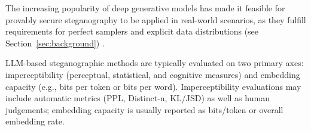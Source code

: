 The increasing popularity of deep generative models has made it feasible for provably secure steganography to be applied in real-world scenarios, as they fulfill requirements for perfect samplers and explicit data distributions (see Section~\ref{sec:background}) \cite{ding2023discop, kaptchuk2021meteor, qi2024provably}.
\par
LLM-based steganographic methods are typically evaluated on two primary axes: imperceptibility (perceptual, statistical, and cognitive measures) and embedding capacity (e.g., bits per token or bits per word). Imperceptibility evaluations may include automatic metrics (PPL, Distinct-n, KL/JSD) as well as human judgements; embedding capacity is usually reported as bits/token or overall embedding rate.
